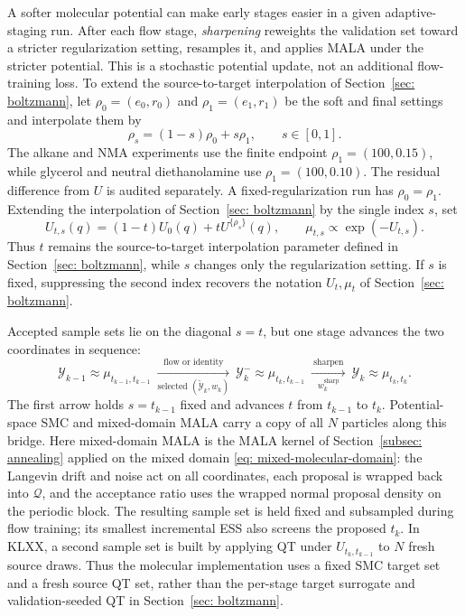 \documentclass{article}
\begin{document}
A softer molecular potential can make early stages easier in a given adaptive-staging run. After each flow stage, \emph{sharpening} reweights the validation set toward a stricter regularization setting, resamples it, and applies MALA under the stricter potential. This is a stochastic potential update, not an additional flow-training loss. To extend the source-to-target interpolation of Section~\ref{sec: boltzmann}, let $\rho_0=(e_0,r_0)$ and $\rho_1=(e_1,r_1)$ be the soft and final settings and interpolate them by
\begin{equation}
\rho_s=(1-s)\rho_0+s\rho_1,
\qquad s\in[0,1].
\label{eq: molecular-sharpening-path}
\end{equation}
The alkane and NMA experiments use the finite endpoint \(\rho_1=(100,0.15)\), while glycerol and neutral diethanolamine use \(\rho_1=(100,0.10)\). The residual difference from \(U\) is audited separately. A fixed-regularization run has \(\rho_0=\rho_1\). Extending the interpolation of Section~\ref{sec: boltzmann} by the single index \(s\), set
\begin{equation}
U_{t,s}(q)=(1-t)U_0(q)+tU^{\{\rho_s\}}(q),
\qquad
\mu_{t,s}\propto\exp(-U_{t,s}).
\label{eq: molecular-two-coordinate-bridge}
\end{equation}
Thus \(t\) remains the source-to-target interpolation parameter defined in Section~\ref{sec: boltzmann}, while \(s\) changes only the regularization setting. If \(s\) is fixed, suppressing the second index recovers the notation \(U_t,\mu_t\) of Section~\ref{sec: boltzmann}.

Accepted sample sets lie on the diagonal $s=t$, but one stage advances the two coordinates in sequence:
\begin{equation}
\mathcal Y_{k-1}\approx\mu_{t_{k-1},t_{k-1}}
\ \xrightarrow[
    \text{selected }(\tilde{\mathcal Y}_k,w_k)
]{\ \text{flow or identity}\ }\
\mathcal Y_k^-\approx\mu_{t_k,t_{k-1}}
\ \xrightarrow[
    w_k^{\mathrm{sharp}}
]{\ \text{sharpen}\ }\
\mathcal Y_k\approx\mu_{t_k,t_k}.
\label{eq: molecular-stage-arrows}
\end{equation}
The first arrow holds $s=t_{k-1}$ fixed and advances $t$ from $t_{k-1}$ to $t_k$. Potential-space SMC and mixed-domain MALA carry a copy of all $N$ particles along this bridge. Here mixed-domain MALA is the MALA kernel of Section~\ref{subsec: annealing} applied on the mixed domain \eqref{eq: mixed-molecular-domain}: the Langevin drift and noise act on all coordinates, each proposal is wrapped back into $\mathcal Q$, and the acceptance ratio uses the wrapped normal proposal density on the periodic block. The resulting sample set is held fixed and subsampled during flow training; its smallest incremental ESS also screens the proposed $t_k$. In KLXX, a second sample set is built by applying QT under $U_{t_k,t_{k-1}}$ to $N$ fresh source draws. Thus the molecular implementation uses a fixed SMC target set and a fresh source QT set, rather than the per-stage target surrogate and validation-seeded QT in Section~\ref{sec: boltzmann}.
\end{document}

